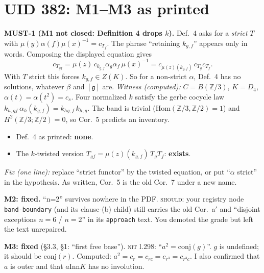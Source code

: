 \documentclass[10pt]{article}
\newcommand{\Z}{\mathbb{Z}}
\newcommand{\iss}[1]{\textsc{#1}}
\newcommand{\Inn}{\mathrm{Inn}}\newcommand{\Out}{\mathrm{Out}}\newcommand{\Aut}{\mathrm{Aut}}
\begin{document}
\section{UID 382: M1--M3 as printed}
\textbf{MUST-1 (M1 not closed: Definition 4 drops $k$).} Def.~4 asks for a \emph{strict} $T$ with $\mu(y)\alpha(f)\mu(x)^{-1}=c_{T_f}$. The phrase ``retaining $k_{g,f}$'' appears only in words. Composing the displayed equation gives
\[c_{T_{gf}}=\mu(z)\,c_{k_{g,f}}\alpha_g\alpha_f\,\mu(x)^{-1}=c_{\mu(z)(k_{g,f})}\,c_{T_g}c_{T_f}.\] With $T$ strict this forces $k_{g,f}\in Z(K)$. So for a non-strict $\alpha$, Def.~4 has no solutions, whatever $\beta$ and $[\mathfrak g]$ are.
\emph{Witness (computed):} $C=B(\Z/3)$, $K=D_4$, $\alpha(t)=\alpha(t^2)=c_s$. Four normalized $k$ satisfy the gerbe cocycle law $k_{h,gf}\,\alpha_h(k_{g,f})=k_{hg,f}\,k_{h,g}$. The band is trivial ($\mathrm{Hom}(\Z/3,\Z/2)=1$) and $H^2(\Z/3;\Z/2)=0$, so Cor.~5 predicts an inventory.
\begin{itemize}
\item Def.~4 as printed: \textbf{none}.
\item The $k$-twisted version $T_{gf}=\mu(z)(k_{g,f})\,T_gT_f$: \textbf{exists}.
\end{itemize}
\emph{Fix (one line):} replace ``strict functor'' by the twisted equation, or put ``$\alpha$ strict'' in the hypothesis. As written, Cor.~5 is the old Cor.~7 under a new name.

\textbf{M2: fixed.} ``n=2'' survives nowhere in the PDF. \iss{should}: your registry node \texttt{band-boundary} (and its clause-(b) child) still carries the old Cor.~a$'$ and ``disjoint exceptions $n=6$ / $n=2$'' in its \texttt{approach} text. You demoted the grade but left the text unrepaired.

\textbf{M3: fixed} (\S3.3, \S1: ``first free base''). \iss{nit} l.298: ``$a^2=\mathrm{conj}(g)$''. $g$ is undefined; it should be $\mathrm{conj}(r)$. Computed: $a^2=c_r=c_{rc}=c_{r^3}=c_{r^3c}$. I also confirmed that $a$ is outer and that $a\Inn K$ has no involution.
\end{document}
